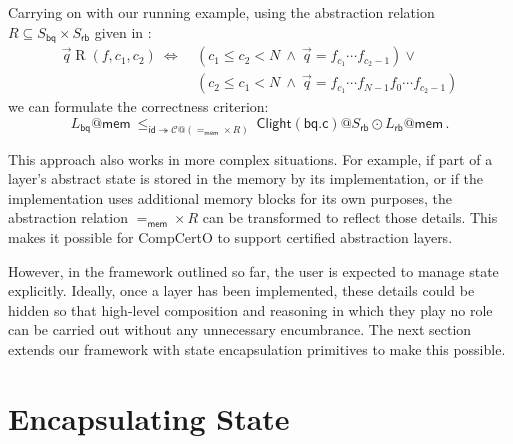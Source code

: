 \documentclass[acmsmall,screen,review,anonymous]{acmart}
\newcommand{\kw}[1]{\ensuremath{ \mathsf{#1} }}
\begin{document}
\begin{example}[Correctness of \kw{bq.c}] \label{ex:bqcorrect}
Carrying on with our running example,
using the abstraction relation $R \subseteq S_\kw{bq} \times S_\kw{rb}$
given in \citet{rbgs-cal}:
\begin{align*}
  \vec{q} \mathrel{R} (f, c_1, c_2) \:\Leftrightarrow\: {}
    & (c_1 \le c_2 < N \:\wedge\: \vec{q} = f_{c_1} \cdots f_{c_2-1}) \vee {} \\
    & (c_2 \le c_1 < N \:\wedge\: \vec{q} = f_{c_1} \cdots f_{N-1} f_0 \cdots f_{c_2 - 1})
\end{align*}
we can formulate the correctness criterion:
\[
  L_\kw{bq}@\kw{mem}
  \:\le_{\kw{id} \twoheadrightarrow \mathcal{C}@({=}_\kw{mem} \times R)}\:
  \kw{Clight}(\kw{bq.c})@S_\kw{rb} \odot
  L_\kw{rb}@\kw{mem}
  \,.
\]
\end{example}

This approach also works in more complex situations.
For example,
if part of a layer's abstract state is
stored in the memory by its implementation,
or if the implementation uses additional memory blocks
for its own purposes,
the abstraction relation ${=}_\kw{mem} \times R$
can be transformed to reflect those details.
This makes it possible for CompCertO
to support certified abstraction layers.

However,
in the framework outlined so far,
the user is expected to manage state explicitly.
Ideally,
once a layer has been implemented,
these details could be hidden so that
high-level composition and reasoning
in which they play no role
can be carried out without any unnecessary
encumbrance.
The next section
extends our framework
with state encapsulation primitives
to make this possible.




\section{Encapsulating State} %

\end{document}
